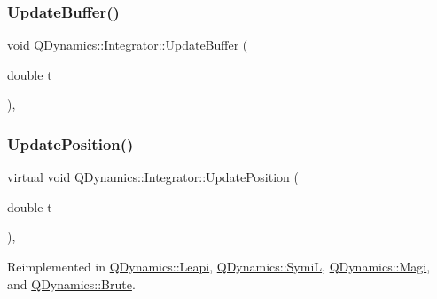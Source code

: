 \mbox{\label{classQDynamics_1_1Integrator_af613a42e489de2d041673fd5be0ebb61}} 
\subsubsection{\texorpdfstring{Update\+Buffer()}{UpdateBuffer()}}
{\footnotesize\ttfamily void Q\+Dynamics\+::\+Integrator\+::\+Update\+Buffer (\begin{DoxyParamCaption}\item[{double}]{t }\end{DoxyParamCaption})\hspace{0.3cm}{\ttfamily [inline]}, {\ttfamily [private]}}

\mbox{\label{classQDynamics_1_1Integrator_a4effa27d56f3205e53653b1fdc5cd08e}} 
\subsubsection{\texorpdfstring{Update\+Position()}{UpdatePosition()}}
{\footnotesize\ttfamily virtual void Q\+Dynamics\+::\+Integrator\+::\+Update\+Position (\begin{DoxyParamCaption}\item[{double}]{t }\end{DoxyParamCaption})\hspace{0.3cm}{\ttfamily [inline]}, {\ttfamily [virtual]}}



Reimplemented in \hyperlink{classQDynamics_1_1Leapi_ada2b4935513fa7e0cb4f78ade9f2fd0e}{Q\+Dynamics\+::\+Leapi}, \hyperlink{classQDynamics_1_1SymiL_a28d23793abeb8f40c9d9ec069d67debb}{Q\+Dynamics\+::\+SymiL}, \hyperlink{classQDynamics_1_1Magi_a500467f899244edfae15f34c84c7684c}{Q\+Dynamics\+::\+Magi}, and \hyperlink{classQDynamics_1_1Brute_ac5d4bbe0e34a9f6836f71f40ae8a9eb4}{Q\+Dynamics\+::\+Brute}.

\mbox{\label{classQDynamics_1_1Integrator_a88dc286b39899bdec60c040427d663cc}} 
